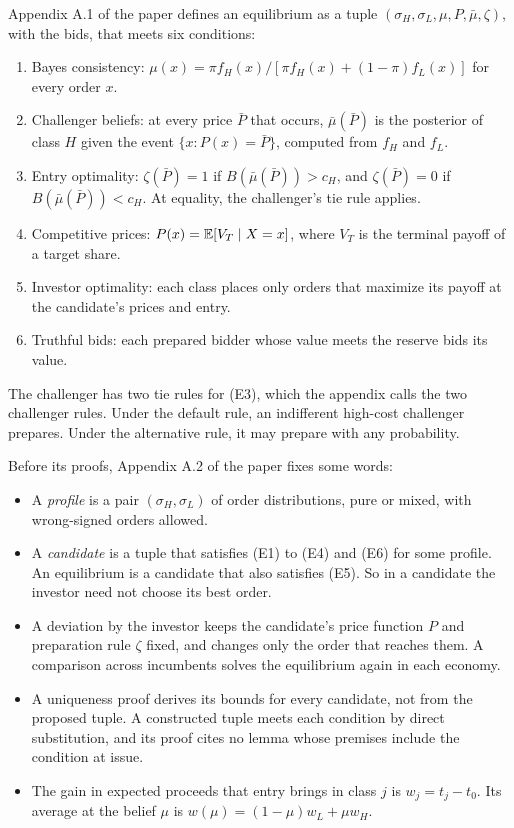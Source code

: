 Appendix A.1 of the paper defines an equilibrium as a tuple \((\sigma_H,\sigma_L,\mu,P,\bar\mu,\zeta)\), with the bids, that meets six conditions:
\begin{enumerate}[label=(E\arabic*),leftmargin=3em]
\item Bayes consistency: \(\mu(x)=\pi f_H(x)/[\pi f_H(x)+(1-\pi)f_L(x)]\) for every order \(x\).
\item Challenger beliefs: at every price \(\bar P\) that occurs, \(\bar\mu(\bar P)\) is the posterior of class \(H\) given the event \(\{x:P(x)=\bar P\}\), computed from \(f_H\) and \(f_L\).
\item Entry optimality: \(\zeta(\bar P)=1\) if \(B(\bar\mu(\bar P))>c_H\), and \(\zeta(\bar P)=0\) if \(B(\bar\mu(\bar P))<c_H\). At equality, the challenger's tie rule applies.
\item Competitive prices: \(P(x)=\mathbb{E}[V_T\mid X=x]\), where \(V_T\) is the terminal payoff of a target share.
\item Investor optimality: each class places only orders that maximize its payoff at the candidate's prices and entry.
\item Truthful bids: each prepared bidder whose value meets the reserve bids its value.
\end{enumerate}
The challenger has two tie rules for (E3), which the appendix calls the two challenger rules. Under the default rule, an indifferent high-cost challenger prepares. Under the alternative rule, it may prepare with any probability.

Before its proofs, Appendix A.2 of the paper fixes some words:
\begin{itemize}
\item A \emph{profile} is a pair \((\sigma_H,\sigma_L)\) of order distributions, pure or mixed, with wrong-signed orders allowed.
\item A \emph{candidate} is a tuple that satisfies (E1) to (E4) and (E6) for some profile. An equilibrium is a candidate that also satisfies (E5). So in a candidate the investor need not choose its best order.
\item A deviation by the investor keeps the candidate's price function \(P\) and preparation rule \(\zeta\) fixed, and changes only the order that reaches them. A comparison across incumbents solves the equilibrium again in each economy.
\item A uniqueness proof derives its bounds for every candidate, not from the proposed tuple. A constructed tuple meets each condition by direct substitution, and its proof cites no lemma whose premises include the condition at issue.
\item The gain in expected proceeds that entry brings in class \(j\) is \(w_j=t_j-t_0\). Its average at the belief \(\mu\) is \(w(\mu)=(1-\mu)w_L+\mu w_H\).
\end{itemize}

